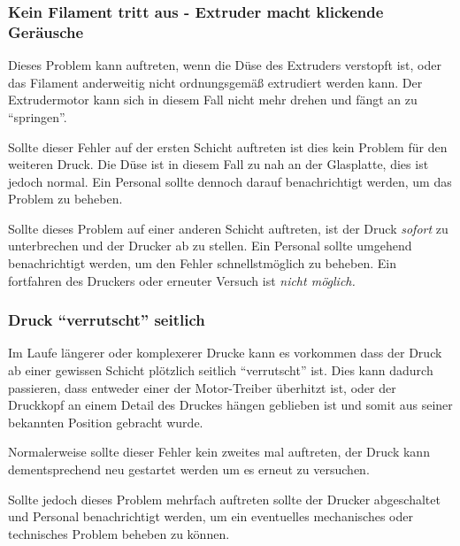 \subsubsection[Kein Filamentaustritt]{Kein Filament tritt aus - Extruder macht klickende Geräusche}

Dieses Problem kann auftreten, wenn die Düse des Extruders verstopft ist, oder das Filament anderweitig nicht ordnungsgemäß extrudiert werden kann. Der Extrudermotor kann sich in diesem Fall nicht mehr drehen und fängt an zu "`springen"'.

Sollte dieser Fehler auf der ersten Schicht auftreten ist dies kein Problem für den weiteren Druck. Die Düse ist in diesem Fall zu nah an der Glasplatte, dies ist jedoch normal. 
Ein Personal sollte dennoch darauf benachrichtigt werden, um das Problem zu beheben.

Sollte dieses Problem auf einer anderen Schicht auftreten, ist der Druck \emph{sofort} zu unterbrechen und der Drucker ab zu stellen. Ein Personal sollte umgehend benachrichtigt werden, um den Fehler schnellstmöglich zu beheben. Ein fortfahren des Druckers oder erneuter Versuch ist \emph{nicht möglich.}

\subsubsection{Druck "`verrutscht"' seitlich}

Im Laufe längerer oder komplexerer Drucke kann es vorkommen dass der Druck ab einer gewissen Schicht plötzlich seitlich "`verrutscht"' ist. Dies kann dadurch passieren, dass entweder einer der Motor-Treiber überhitzt ist, oder der Druckkopf an einem Detail des Druckes hängen geblieben ist und somit aus seiner bekannten Position gebracht wurde.

Normalerweise sollte dieser Fehler kein zweites mal auftreten, der Druck kann dementsprechend neu gestartet werden um es erneut zu versuchen.

Sollte jedoch dieses Problem mehrfach auftreten sollte der Drucker abgeschaltet und Personal benachrichtigt werden, um ein eventuelles mechanisches oder technisches Problem beheben zu können.